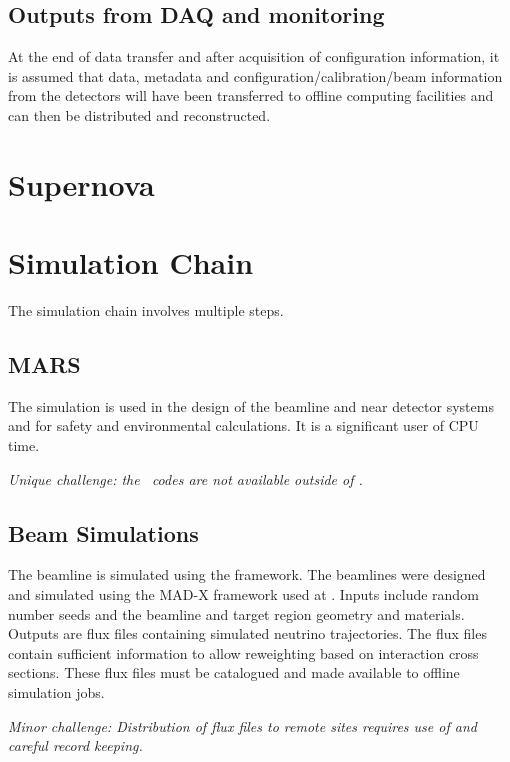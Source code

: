 \documentclass[../main-v1.tex]{subfiles}
\begin{document}
\subsection{Outputs from DAQ and monitoring}

At the end of data transfer and after acquisition of configuration information,  %
it is assumed that data, metadata and configuration/calibration/beam information from the detectors will have been transferred to offline computing facilities and can then be distributed and reconstructed. 

\section{Supernova }


\section{Simulation Chain }

% 
The simulation chain involves multiple steps.

\subsection{MARS}
The \cite{abs1} simulation is used in the design of the beamline and near detector systems and  for safety and environmental calculations.  It is a significant user of CPU time. 

{\it Unique challenge: the \ codes are not available outside of .}

\subsection{Beam Simulations}
The  
beamline is simulated using the  framework.  The  beamlines were designed and simulated using the MAD-X framework used at \cite{PhysRevAccelBeams.20.111001}.
Inputs include random number seeds and the beamline and target region geometry and materials.  Outputs are flux files containing simulated neutrino trajectories.  The flux files contain sufficient information to allow reweighting based on interaction cross sections.  These flux files must be catalogued and made available to offline simulation jobs.

{\it Minor challenge:  Distribution of flux files to remote sites requires use of  and careful record keeping.}
\end{document}
